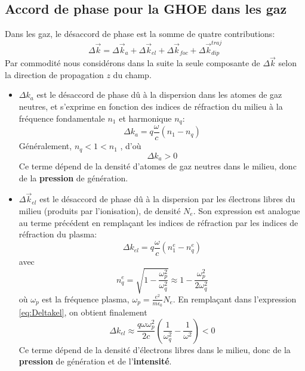 \subsection{Accord de phase pour la GHOE dans les gaz}
Dans les gaz, le désaccord de phase est la somme de quatre contributions:
\begin{equation}
\Delta \vec{k} = \Delta \vec{k}_a + \Delta \vec{k}_{el} + \Delta \vec{k}_{foc} + \Delta \vec{k}_{dip}^{traj}
\end{equation}
Par commodité nous considérons dans la suite la seule composante de $\Delta \vec{k}$ selon la direction de propagation $z$ du champ.
\begin{itemize}
\item $\Delta k_a$ est le désaccord de phase dû à la dispersion dans les atomes de gaz neutres, et s'exprime en fonction des indices de réfraction du milieu à la fréquence fondamentale $n_1$ et harmonique $n_q$: \begin{equation}
\Delta k_a = q \frac{\omega}{c}(n_1 - n_q) 
\end{equation}
Généralement, $n_q < 1 < n_1$ , d'où
\begin{equation}
\Delta k_a > 0
\end{equation}
Ce terme dépend de la densité d'atomes de gaz neutres dans le milieu, donc de la \textbf{pression} de génération.
\item $\Delta \vec{k}_{el}$ est le désaccord de phase dû à la dispersion par les électrons libres du milieu (produits par l'ionisation), de densité $N_e$. Son expression est analogue au terme précédent en remplaçant les indices de réfraction par les indices de réfraction du plasma: 
\begin{equation}
\Delta k_{el} = q \frac{\omega}{c}(n_1^e - n_q^e)
\label{eq:Deltakel}
\end{equation}
avec
\begin{equation}
n_q^e = \sqrt{1 - \frac{\omega_p^2}{\omega_q^2}} \approx 1 -  \frac{\omega_p^2}{2\omega_q^2}
\end{equation}
où $\omega_p$ est la fréquence plasma, $\omega_p = \frac{e^2}{m \epsilon_0} N_e$. En remplaçant dans l'expression \ref{eq:Deltakel}, on obtient finalement
\begin{equation}
\Delta k_{el} \approx \frac{q \omega \omega_p^2}{2c}(\frac{1}{\omega_q^2} - \frac{1}{\omega^2}) < 0
\end{equation}
Ce terme dépend de la densité d'électrons libres dans le milieu, donc de la \textbf{pression} de génération et de l'\textbf{intensité}.

\end{itemize}
